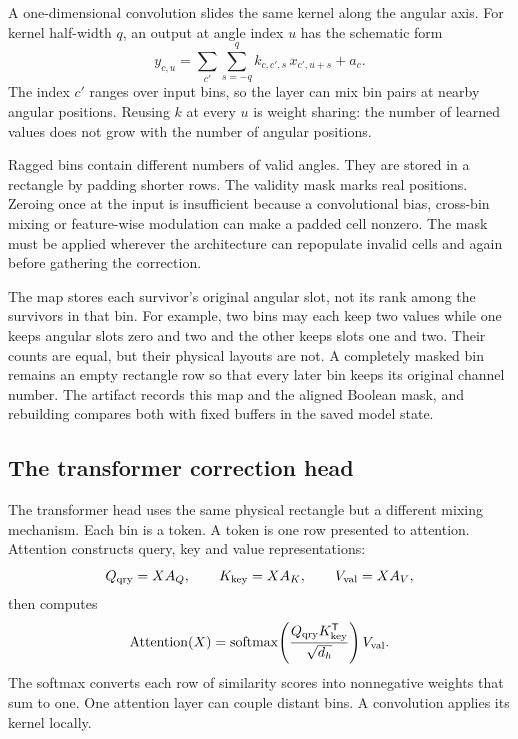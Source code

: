 \documentclass[10pt,aps,prd,twocolumn,nofootinbib]{revtex4-2}
\begin{document}
A one-dimensional convolution slides the same kernel along the angular axis.
For kernel half-width $q$, an output at angle index $u$ has the schematic form
\begin{equation*}
 y_{c,u}=\sum_{c'}\sum_{s=-q}^{q}
          k_{c,c',s}\,x_{c',u+s}+a_c.
\end{equation*}
The index $c'$ ranges over input bins, so the layer can mix bin pairs at
nearby angular positions.  Reusing $k$ at every $u$ is weight sharing: the
number of learned values does not grow with the number of angular positions.

Ragged bins contain different numbers of valid angles.  They are stored in a
rectangle by padding shorter rows.  The validity
mask marks real positions.  Zeroing once at the input is insufficient because
a convolutional bias, cross-bin mixing or feature-wise modulation can make a
padded cell nonzero.  The mask must be applied wherever the architecture can
repopulate invalid cells and again before gathering the correction.

The map stores each survivor's original angular slot, not its rank among the
survivors in that bin.  For example, two bins may each keep two values while
one keeps angular slots zero and two and the other keeps slots one and two.
Their counts are equal, but their physical layouts are not.  A completely
masked bin remains an empty rectangle row so that every later bin keeps its
original channel number.  The artifact records this map and the aligned
Boolean mask, and rebuilding compares both with fixed buffers in the saved
model state.

\subsection{The transformer correction head}

The transformer head uses the same physical rectangle but a different mixing
mechanism.  Each bin is a token.  A token is one row presented to attention.
Attention constructs query, key and value representations:
\begin{equation*}
 Q_{\rm qry}=XA_Q,\qquad
 K_{\rm key}=XA_K,\qquad
 V_{\rm val}=XA_V,
\end{equation*}
then computes
\begin{equation}
 \operatorname{Attention}(X)
 =\operatorname{softmax}\!\left(
   \frac{Q_{\rm qry}K_{\rm key}^{\mathsf T}}{\sqrt{d_h}}
  \right)V_{\rm val}.
 \label{eq:attention}
\end{equation}
The softmax converts each row of similarity scores into nonnegative weights
that sum to one.  One attention layer can couple distant bins.  A convolution
applies its kernel locally.
\end{document}

